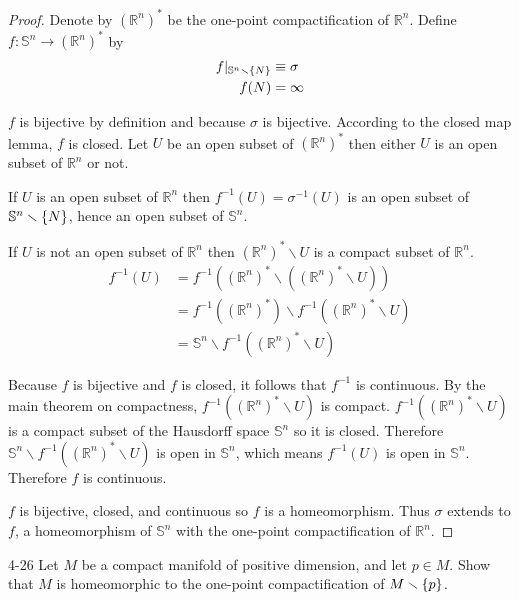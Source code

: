 \begin{proof}
	Denote by ${(\mathbb{R}^{n})}^{*}$ be the one-point compactification of $\mathbb{R}^{n}$. Define $f: \mathbb{S}^{n} \to {(\mathbb{R}^{n})}^{*}$ by
	\begin{align*}
		f\vert_{\mathbb{S}^{n}\smallsetminus\left\{{N}\right\}} & \equiv \sigma \\
		f(N)                                         & = \infty
	\end{align*}

	$f$ is bijective by definition and because $\sigma$ is bijective. According to the closed map lemma, $f$ is closed. Let $U$ be an open subset of ${(\mathbb{R}^{n})}^{*}$ then either $U$ is an open subset of $\mathbb{R}^{n}$ or not.

	If $U$ is an open subset of $\mathbb{R}^{n}$ then $f^{-1}(U) = \sigma^{-1}(U)$ is an open subset of $\mathbb{S}^{n}\smallsetminus\left\{{N}\right\}$, hence an open subset of $\mathbb{S}^{n}$.

	If $U$ is not an open subset of $\mathbb{R}^{n}$ then ${(\mathbb{R}^{n})}^{*}\smallsetminus U$ is a compact subset of $\mathbb{R}^{n}$.
	\begin{align*}
		f^{-1}(U) & = f^{-1}({(\mathbb{R}^{n})}^{*} \smallsetminus ({(\mathbb{R}^{n})}^{*} \smallsetminus U))      \\
		          & = f^{-1}({(\mathbb{R}^{n})}^{*}) \smallsetminus f^{-1}({(\mathbb{R}^{n})}^{*}\smallsetminus U) \\
		          & = \mathbb{S}^{n} \smallsetminus f^{-1}({(\mathbb{R}^{n})}^{*}\smallsetminus U)
	\end{align*}

	Because $f$ is bijective and $f$ is closed, it follows that $f^{-1}$ is continuous. By the main theorem on compactness, $f^{-1}({(\mathbb{R}^{n})}^{*}\smallsetminus U)$ is compact. $f^{-1}({(\mathbb{R}^{n})}^{*}\smallsetminus U)$ is a compact subset of the Hausdorff space $\mathbb{S}^{n}$ so it is closed. Therefore $\mathbb{S}^{n} \smallsetminus f^{-1}({(\mathbb{R}^{n})}^{*}\smallsetminus U)$ is open in $\mathbb{S}^{n}$, which means $f^{-1}(U)$ is open in $\mathbb{S}^{n}$. Therefore $f$ is continuous.

	$f$ is bijective, closed, and continuous so $f$ is a homeomorphism. Thus $\sigma$ extends to $f$, a homeomorphism of $\mathbb{S}^{n}$ with the one-point compactification of $\mathbb{R}^{n}$.
\end{proof}

\begin{problem}{4-26}\label{problem:4-26}
Let $M$ be a compact manifold of positive dimension, and let $p\in M$. Show that $M$ is homeomorphic to the one-point compactification of $M\smallsetminus \left\{{p}\right\}$.
\end{problem}

